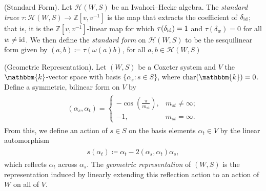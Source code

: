 \noindent\begin{definition}\textup{(Standard Form).} Let $\mathscr{H}(W, S)$ be an Iwahori--Hecke algebra. The {\em standard trace} $\tau : \mathscr{H}(W, S) \to \mathbb{Z}[v, v^{-1}]$ is the map that extracts the coefficient of $\delta_\textup{id}$; that is, it is the $\mathbb{Z}[v, v^{-1}]$-linear map for which $\tau(\delta_\textup{id}) = 1$ and $\tau(\delta_w) = 0$ for all $w \neq \textup{id}$. We then define the {\em standard form} on $\mathscr{H}(W, S)$ to be the sesquilinear form given by $(a, b) \coloneqq \tau(\omega(a)b)$, for all $a, b \in \mathscr{H}(W, S)$\\
\end{definition}

\noindent\begin{definition}\label{GeometricRepresentation}\textup{(Geometric Representation).} Let $(W, S)$ be a Coxeter system and $V$ the $\mathbbm{k}$-vector space with basis $\{\alpha_s : s \in S\}$, where $\textup{char}(\mathbbm{k}) = 0$. Define a symmetric, bilinear form on $V$ by%
\begin{align*}
\begin{split}
(\alpha_s, \alpha_t) = \begin{cases}-\cos\!\left(\frac{\pi}{m_{st}}\right)\!,&m_{st} \neq \infty;\\-1,&m_{st} = \infty.\end{cases}
\end{split}
\end{align*}
\noindent From this, we define an action of $s \in S$ on the basis elements $\alpha_t \in V$ by the linear automorphism
\begin{align*}
\begin{split}
s(\alpha_t) \coloneqq \alpha_t - 2(\alpha_s, \alpha_t)\alpha_s,
\end{split}
\end{align*}
\noindent which reflects $\alpha_t$ across $\alpha_s$. The {\em geometric representation} of $(W, S)$ is the representation induced by linearly extending this reflection action to an action of $W$ on all of $V$.\\
\end{definition}

